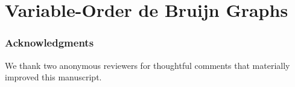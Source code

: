 \chapter{Variable-Order de Bruijn Graphs}

\begin{quote}

\end{quote}








\subsection*{Acknowledgments}
We thank two anonymous reviewers for thoughtful comments that materially improved this manuscript.